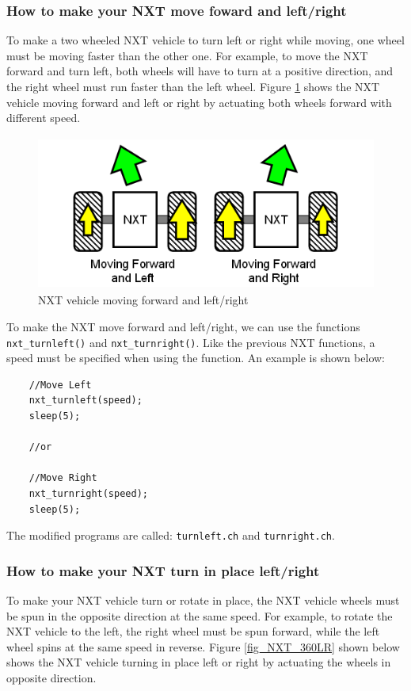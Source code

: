 \documentclass[12pt]{article}
\begin{document}
\subsubsection{How to make your NXT move foward and left/right}
To make a two wheeled NXT vehicle to turn left or right while moving, one wheel must be moving 
faster than the other one.  For example, to move the NXT forward and turn left, both wheels will 
have to turn at a positive direction, and the right wheel must run faster than the left wheel. 
Figure \ref{fig_NXT_leftright} shows the NXT vehicle moving forward and left or right by actuating
both wheels forward with different speed.

\begin{figure}[h]
  \begin{center}
    \includegraphics[height=2in]{figure/mindstorm/Vehicle_LR.png}
    \caption{NXT vehicle moving forward and left/right \label{fig_NXT_leftright}}
  \end{center}
\end{figure}

To make the NXT move forward and left/right, we can use the functions \verb+nxt_turnleft()+ 
and \verb+nxt_turnright()+. Like the previous NXT functions, a speed must be specified when 
using the function.  An example is shown below:
\begin{verbatim}
    //Move Left 
    nxt_turnleft(speed);
    sleep(5);
    
    //or
    
    //Move Right
    nxt_turnright(speed);
    sleep(5);
\end{verbatim}
The modified programs are called: \verb+turnleft.ch+ and \verb+turnright.ch+.
\subsubsection{How to make your NXT turn in place left/right}
To make your NXT vehicle turn or rotate in place, the NXT vehicle wheels must be spun in the opposite direction 
at the same speed. For example, to rotate the NXT vehicle to the left, the right wheel must be spun forward, while 
the left wheel spins at the same speed in reverse. 
Figure \ref{fig_NXT_360LR} shown below shows the NXT vehicle turning in place left or right by actuating the wheels in
    opposite direction.
\end{document}
